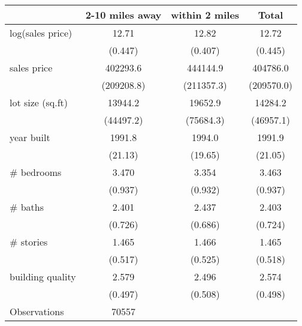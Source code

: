 \begin{tabular}{l*{3}{c}}
\hline\hline
                    &2-10 miles away&within 2 miles&       Total\\
\hline
log(sales price)    &       12.71&       12.82&       12.72\\
                    &     (0.447)&     (0.407)&     (0.445)\\
[1em]
sales price         &    402293.6&    444144.9&    404786.0\\
                    &  (209208.8)&  (211357.3)&  (209570.0)\\
[1em]
lot size (sq.ft)    &     13944.2&     19652.9&     14284.2\\
                    &   (44497.2)&   (75684.3)&   (46957.1)\\
[1em]
year built          &      1991.8&      1994.0&      1991.9\\
                    &     (21.13)&     (19.65)&     (21.05)\\
[1em]
\# bedrooms         &       3.470&       3.354&       3.463\\
                    &     (0.937)&     (0.932)&     (0.937)\\
[1em]
\# baths            &       2.401&       2.437&       2.403\\
                    &     (0.726)&     (0.686)&     (0.724)\\
[1em]
\# stories          &       1.465&       1.466&       1.465\\
                    &     (0.517)&     (0.525)&     (0.518)\\
[1em]
building quality    &       2.579&       2.496&       2.574\\
                    &     (0.497)&     (0.508)&     (0.498)\\
\hline
Observations        &       70557&            &            \\
\hline\hline
\end{tabular}
